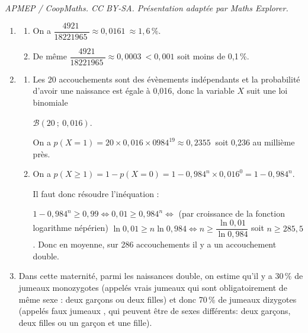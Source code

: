 \documentclass[10pt]{article}
\providecommand{\np}[2][]{{#2~#1}}
\begin{document}
\noindent\textit{APMEP / CoopMaths. CC BY-SA. Présentation adaptée par Maths Explorer.}\par\medskip
\medskip

\begin{enumerate}
\item 

	\begin{enumerate}
		\item 
		On a $\dfrac{\np{4921}}{\np{18221965}} \approx \np{0,0161} \approx 1,6\,\%$.
		\item 
De même $\dfrac{\np{4921}}{\np{18221965}} \approx \np{0,0003}< 0,001$ soit moins de 0,1\,\%.













	\end{enumerate}
\item 




	\begin{enumerate}
		\item 
Les 20 accouchements sont des évènements indépendants et la probabilité d'avoir une naissance est égale à 0,016, donc la variable $X$ suit une loi binomiale 

$\mathcal{B}(20~;~0,016)$.

On a $p(X = 1) = 20 \times 0,016 \times 0984^{19} \approx \np{0,2355}$ soit 0,236 au millième près.
		\item 
		
On a $p(X \geqslant 1) = 1 - p(X = 0) = 1 - 0,984^n \times 0,016^0  = 1 - 0,984^n$.

Il faut donc résoudre l'inéquation :

$1 - 0,984^n \geqslant 0,99 \iff 0,01 \geqslant 0,984^n \iff$ (par croissance de la fonction logarithme népérien) $\ln 0,01 \geqslant n \ln 0,984 \iff n \geqslant \dfrac{\ln 0,01}{ \ln 0,984}$ soit $n \geqslant 285,5$. Donc en moyenne, sur 286 accouchements il y a un accouchement double.


	\end{enumerate}
\item Dans cette maternité, parmi les naissances double, on estime qu'il y a 30\,\% de jumeaux
monozygotes (appelés \og  vrais jumeaux \fg{} qui sont obligatoirement de même sexe : deux garçons ou deux filles) et donc 70\,\% de jumeaux dizygotes (appelés \og  faux jumeaux \fg, qui
peuvent être de sexes différents: deux garçons, deux filles ou un garçon et une fille).


\end{enumerate}
\end{document}
